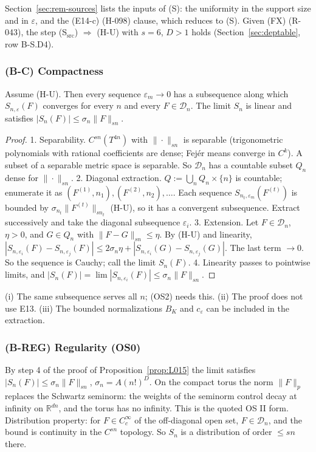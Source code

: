 Section~\ref{sec:rem-sources} lists the inputs of (S): the uniformity in the support size and in $\varepsilon$, and the (E14-c) (H-098) clause, which reduces to (S). Given (FX) (R-043), the step (S$_{\mathrm{src}}$) $\Rightarrow$ (H-U) with $s=6$, $D>1$ holds (Section~\ref{sec:deptable}, row B-S.D4).

\subsubsection{(B-C) Compactness}\label{sec:BC}
\begin{proposition}\label{prop:L015}
Assume (H-U). Then every sequence $\varepsilon_m\to0$ has a subsequence along which $S_{n,\varepsilon}(F)$ converges for every $n$ and every $F\in\mathcal D_n$. The limit $S_n$ is linear and satisfies $|S_n(F)|\le\sigma_n\|F\|_{sn}$.
\end{proposition}
\begin{proof}
1. Separability. $C^{sn}(T^{4n})$ with $\|\cdot\|_{sn}$ is separable (trigonometric polynomials with rational coefficients are dense; Fej\'er means converge in $C^k$). A subset of a separable metric space is separable. So $\mathcal D_n$ has a countable subset $Q_n$ dense for $\|\cdot\|_{sn}$.
2. Diagonal extraction. $Q:=\bigcup_nQ_n\times\{n\}$ is countable; enumerate it as $(F^{(1)},n_1),(F^{(2)},n_2),\dots$. Each sequence $S_{n_t,\varepsilon_m}(F^{(t)})$ is bounded by $\sigma_{n_t}\|F^{(t)}\|_{sn_t}$ (H-U), so it has a convergent subsequence. Extract successively and take the diagonal subsequence $\varepsilon_i$.
3. Extension. Let $F\in\mathcal D_n$, $\eta>0$, and $G\in Q_n$ with $\|F-G\|_{sn}\le\eta$. By (H-U) and linearity, $|S_{n,\varepsilon_i}(F)-S_{n,\varepsilon_j}(F)|\le2\sigma_n\eta+|S_{n,\varepsilon_i}(G)-S_{n,\varepsilon_j}(G)|$. The last term $\to0$. So the sequence is Cauchy; call the limit $S_n(F)$.
4. Linearity passes to pointwise limits, and $|S_n(F)|=\lim|S_{n,\varepsilon_i}(F)|\le\sigma_n\|F\|_{sn}$.
\end{proof}
\begin{remark}
(i) The same subsequence serves all $n$; (OS2) needs this. (ii) The proof does not use E13. (iii) The bounded normalizations $B_K$ and $c_\varepsilon$ can be included in the extraction.
\end{remark}

\subsubsection{(B-REG) Regularity (OS0)}\label{sec:BREG}
By step 4 of the proof of Proposition~\ref{prop:L015} the limit satisfies $|S_n(F)|\le\sigma_n\|F\|_{sn}$, $\sigma_n=A(n!)^D$. On the compact torus the norm $\|F\|_p$ replaces the Schwartz seminorm: the weights of the seminorm control decay at infinity on $\mathbb R^{dn}$, and the torus has no infinity. This is the quoted OS II form. Distribution property: for $F\in C_c^\infty$ of the off-diagonal open set, $F\in\mathcal D_n$, and the bound is continuity in the $C^{sn}$ topology. So $S_n$ is a distribution of order $\le sn$ there.

